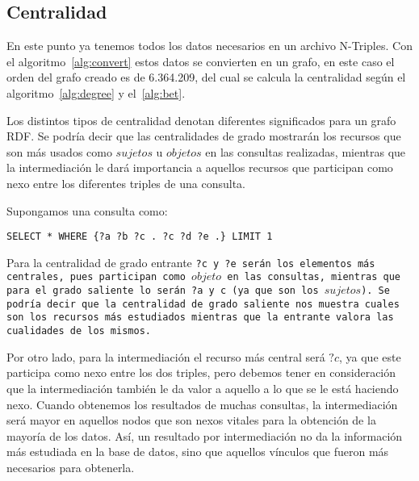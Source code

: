 \subsection{Centralidad}\label{sec:res:cent}
En este punto ya tenemos todos los datos necesarios en un archivo N-Triples. Con
el algoritmo~\ref{alg:convert} estos datos se convierten en un grafo, en este
caso el orden del grafo creado es de 6.364.209, del cual se calcula la
centralidad según el algoritmo~\ref{alg:degree} y el~\ref{alg:bet}.

Los distintos tipos de centralidad denotan diferentes significados para un grafo
RDF.
Se podría decir que las centralidades de grado mostrarán los recursos que son
más usados como $sujetos$ u $objetos$ en las consultas realizadas, mientras que
la intermediación le dará importancia a aquellos recursos que participan como
nexo entre los diferentes triples de una consulta.

Supongamos una consulta como:
\begin{center}
  \tt{SELECT * WHERE \{?a ?b ?c . ?c ?d ?e .\} LIMIT 1}
\end{center}
Para la centralidad de grado entrante \tt{?c} y \tt{?e} serán los elementos más
centrales, pues participan como $objeto$ en las consultas, mientras que para el
grado saliente lo serán \tt{?a} y \tt{c} (ya que son los $sujetos$).
Se podría decir que la centralidad de grado saliente nos muestra cuales son los
recursos más estudiados mientras que la entrante valora las cualidades de los
mismos.

Por otro lado, para la intermediación el recurso más central será $?c$, ya que
este participa como nexo entre los dos triples, pero debemos tener en
consideración que la intermediación también le da valor a aquello a lo que se le
está haciendo nexo.
Cuando obtenemos los resultados de muchas consultas, la intermediación será
mayor en aquellos nodos que son nexos vitales para la obtención de la mayoría de
los datos.
Así, un resultado por intermediación no da la información más estudiada en la
base de datos, sino que aquellos vínculos que fueron más necesarios para
obtenerla.

